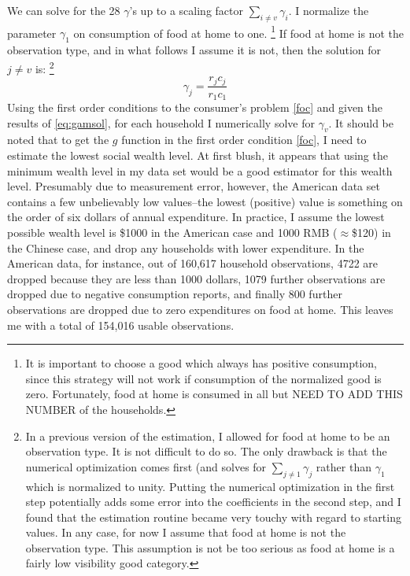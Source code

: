 \documentclass[12pt]{article}
\begin{document}
We can solve for the 28 $\gamma$'s up to a scaling factor $\sum_{i\neq v}\gamma_i$.
I normalize the parameter $\gamma_1$ on consumption of food at home to one. 
\footnote{It is important to choose a good which always has positive consumption, since this strategy will not work if consumption of the normalized good is zero.  
Fortunately, food at home is consumed in all but NEED TO ADD THIS NUMBER of the households.}
If food at home is not the observation type, and in what follows I assume it is not, then the solution for $j \neq v$ is:
\footnote{In a previous version of the estimation, I allowed for food at home to be an observation type.
It is not difficult to do so.
The only drawback is that the numerical optimization comes first (and solves for $\sum_{j \neq 1} \gamma_j$ rather than $\gamma_1$ which is normalized to unity.  
Putting the numerical optimization in the first step potentially adds some error into the coefficients in the second step, and I found that the estimation routine became very touchy with regard to starting values.
In any case, for now I assume that food at home is not the observation type.
This assumption is not be too serious as food at home is a fairly low visibility good category.
}
\begin{equation}
	\label{eq:gamsol}
	\gamma_j = \frac{r_j c_j}{r_1 c_1}
\end{equation}
Using the first order conditions to the consumer's problem \eqref{foc} and given the results of \eqref{eq:gamsol}, for each household I numerically solve for  $\gamma_v$.
It should be noted that to get the $g$ function in the first order condition \eqref{foc}, I need to estimate the lowest social wealth level. 
At first blush, it appears that using the minimum wealth level in my data set would be a good estimator for this wealth level.
Presumably due to measurement error, however, the American data set contains a few unbelievably low values--the lowest (positive) value is something on the order of six dollars of annual expenditure.
In practice, I assume the lowest possible wealth level is \$1000 in the American case and 1000 RMB ($\approx$\$120) in the Chinese case, and drop any households with lower expenditure.
In the American data, for instance, out of 160,617 household observations, 4722 are dropped because they are less than 1000 dollars, 1079 further observations are dropped due to negative consumption reports, and finally 800 further observations are dropped due to zero expenditures on food at home.
This leaves me with a total of 154,016 usable observations.
\end{document}
